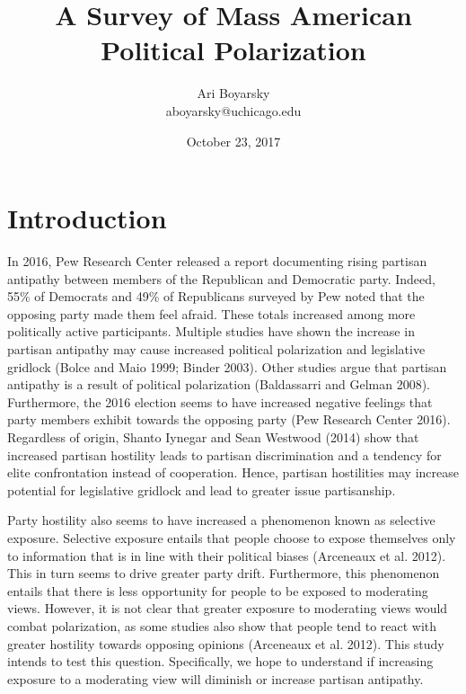 \documentclass[12pt]{article}
\begin{document}

\title{A Survey of Mass American Political Polarization}
\author{Ari Boyarsky \\ aboyarsky@uchicago.edu}
\date{October 23, 2017}



\maketitle


\section{Introduction}

In 2016, Pew Research Center released a report documenting rising partisan antipathy between members of the Republican and Democratic party. Indeed, 55\% of Democrats and 49\% of Republicans surveyed by Pew noted that the opposing party made them feel afraid. These totals increased among more politically active participants.  Multiple studies have shown the increase in partisan antipathy may cause increased political polarization and legislative gridlock (Bolce and Maio 1999; Binder 2003). Other studies argue that partisan antipathy is a result of political polarization (Baldassarri and Gelman 2008). Furthermore, the 2016 election seems to have increased negative feelings that party members exhibit towards the opposing party (Pew Research Center 2016). Regardless of origin, Shanto Iynegar and Sean Westwood (2014) show that increased partisan hostility leads to partisan discrimination and a tendency for elite confrontation instead of cooperation. Hence, partisan hostilities may increase potential for legislative gridlock and lead to greater issue partisanship.


Party hostility also seems to have increased a phenomenon known as selective exposure. Selective exposure entails that people choose to expose themselves only to information that is in line with their political biases (Arceneaux et al. 2012). This in turn seems to drive greater party drift. Furthermore, this phenomenon entails that there is less opportunity for people to be exposed to moderating views. However, it is not clear that greater exposure to moderating views would combat polarization, as some studies also show that people tend to react with greater hostility towards opposing opinions (Arceneaux et al. 2012). This study intends to test this question. Specifically, we hope to understand if increasing exposure to a moderating view will diminish or increase partisan antipathy.    
\end{document}
